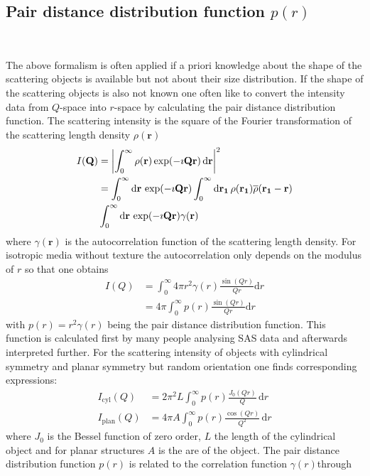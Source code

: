 \subsection{Pair distance distribution function $p(r)$}~\\
\label{sec:p(r)}

The above formalism is often applied if a priori knowledge about the shape of the scattering objects is available but not about their size distribution. If the shape of the scattering objects is also not known one often like to convert the intensity data from $Q$-space into $r$-space by calculating the pair distance distribution function. The scattering intensity is the square of the Fourier transformation of the scattering length density $\rho(\mathbf{r})$
\begin{align}
I(\mathbf{Q}) &= \abs{\int_0^\infty \rho(\mathbf{r}) \exp(-\imath \mathbf{Q r}) \, \mathrm{d}\mathbf{r}}^2  \\
              &= \int_0^\infty \mathrm{d}\mathbf{r} \,  \exp(-\imath \mathbf{Q r}) \int_0^\infty \mathrm{d}\mathbf{r_1}\, \rho(\mathbf{r_1}) \overline{\rho}(\mathbf{r_1}-\mathbf{r}) \\
              & \int_0^\infty \mathrm{d}\mathbf{r} \,\exp(-\imath \mathbf{Q r}) \gamma(\mathbf{r})
\end{align}
where $\gamma(\mathbf{r})$ is the autocorrelation function of the scattering length density. For isotropic media without texture the autocorrelation only depends on the modulus of $r$ so that one obtains
\begin{align}
I(Q) &= \int_0^\infty 4\pi r^2 \gamma(r) \frac{\sin(Qr)}{Qr} \mathrm{d}r\\
     &= 4\pi \int_0^\infty p(r) \frac{\sin(Qr)}{Qr} \mathrm{d}r \label{eq:Isp}
\end{align}
with $p(r)= r^2 \gamma(r)$ being the pair distance distribution function. This function is calculated first by many people analysing SAS data and afterwards interpreted further. For the scattering intensity of objects with cylindrical symmetry and planar symmetry but random orientation one finds corresponding expressions:
\begin{align}
I_\mathrm{cyl}(Q) &= 2\pi^2 L \int_0^\infty p(r) \frac{J_0(Qr)}{Q} \, \mathrm{d}r \label{eq:Icyl} \\
I_\mathrm{plan}(Q) &= 4\pi A \int_0^\infty p(r) \frac{\cos(Qr)}{Q^2} \, \mathrm{d}r \label{eq:Ipl}
\end{align}
where $J_0$ is the Bessel function of zero order, $L$ the length of the cylindrical object and for planar structures $A$ is the are of the object. The pair distance distribution function $p(r)$ is related to the correlation function $\gamma(r)$through
